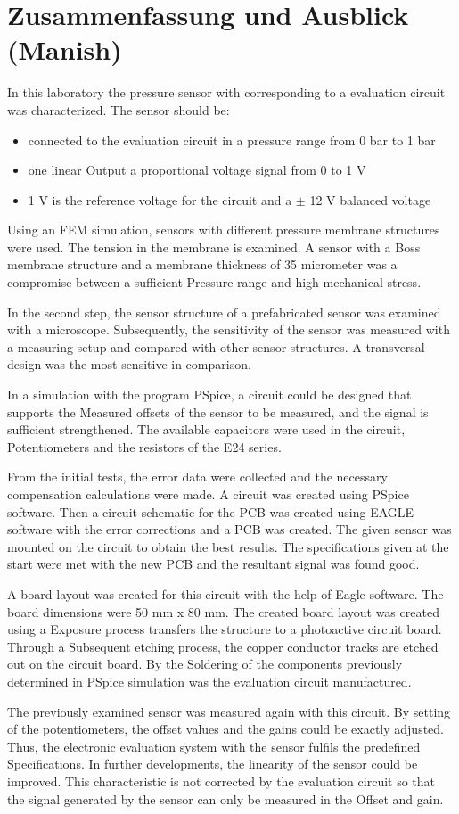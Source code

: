 \chapter{Zusammenfassung und Ausblick (Manish)}
\label{sec:Zusammenfassung}
In this laboratory the pressure sensor with corresponding to a evaluation circuit was characterized. The sensor should be:

\begin{itemize}
	\item connected to the evaluation circuit in a pressure range from 0 bar to 1 bar
	\item one linear Output a proportional voltage signal from 0 to 1 V
	\item 1 V is the reference voltage for the circuit and a $\pm$ 12 V balanced voltage
\end{itemize}

Using an FEM simulation, sensors with different pressure membrane structures were used. The tension in the membrane is examined. A sensor with a Boss membrane structure and a membrane thickness of 35 micrometer was a compromise between a sufficient Pressure range and high mechanical stress.

In the second step, the sensor structure of a prefabricated sensor was examined with a microscope. Subsequently, the sensitivity of the sensor was measured with a measuring setup and compared with other sensor structures. A transversal design was the most sensitive in comparison.

In a simulation with the program PSpice, a circuit could be designed that supports the Measured offsets of the sensor to be measured, and the signal is sufficient strengthened. The available capacitors were used in the circuit, Potentiometers and the resistors of the E24 series.

From the initial tests, the error data were collected and the necessary compensation calculations were made. A circuit was created using PSpice software. Then a circuit schematic for the PCB was created using EAGLE software with the error corrections and a PCB was created. The given sensor was mounted on the circuit to obtain the best results. The specifications given at the start were met with the new PCB and the resultant signal was found good.

A board layout was created for this circuit with the help of Eagle software. The board dimensions were 50 mm x 80 mm. The created board layout was created using a Exposure process transfers the structure to a photoactive circuit board. Through a Subsequent etching process, the copper conductor tracks are etched out on the circuit board. By the Soldering of the components previously determined in PSpice simulation was the evaluation circuit manufactured.

The previously examined sensor was measured again with this circuit. By setting of the potentiometers, the offset values and the gains could be exactly adjusted. Thus, the electronic evaluation system with the sensor fulfils the predefined Specifications. In further developments, the linearity of the sensor could be improved. This characteristic is not corrected by the evaluation circuit so that the signal generated by the sensor can only be measured in the Offset and gain.